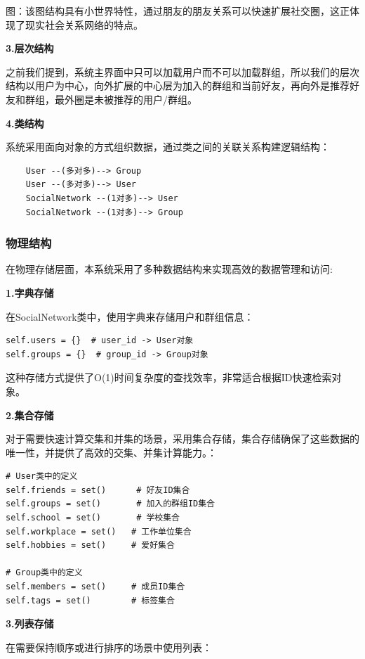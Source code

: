 \documentclass[12pt,a4paper]{article}
\begin{document}
图：该图结构具有小世界特性，通过朋友的朋友关系可以快速扩展社交圈，这正体现了现实社会关系网络的特点。

\noindent\textbf{3.层次结构}

之前我们提到，系统主界面中只可以加载用户而不可以加载群组，所以我们的层次结构以用户为中心，向外扩展的中心层为加入的群组和当前好友，再向外是推荐好友和群组，最外圈是未被推荐的用户/群组。

\noindent\textbf{4.类结构}

系统采用面向对象的方式组织数据，通过类之间的关联关系构建逻辑结构：

\begin{verbatim}
    User --(多对多)--> Group
    User --(多对多)--> User
    SocialNetwork --(1对多)--> User
    SocialNetwork --(1对多)--> Group
\end{verbatim}

\subsubsection{物理结构}

在物理存储层面，本系统采用了多种数据结构来实现高效的数据管理和访问:

\noindent\textbf{1.字典存储}

在SocialNetwork类中，使用字典来存储用户和群组信息：

\begin{verbatim}
self.users = {}  # user_id -> User对象
self.groups = {}  # group_id -> Group对象
\end{verbatim}

这种存储方式提供了O(1)时间复杂度的查找效率，非常适合根据ID快速检索对象。

\noindent\textbf{2.集合存储}

对于需要快速计算交集和并集的场景，采用集合存储，集合存储确保了这些数据的唯一性，并提供了高效的交集、并集计算能力。：

\begin{verbatim}
# User类中的定义
self.friends = set()      # 好友ID集合
self.groups = set()       # 加入的群组ID集合  
self.school = set()       # 学校集合
self.workplace = set()   # 工作单位集合
self.hobbies = set()     # 爱好集合

# Group类中的定义
self.members = set()     # 成员ID集合
self.tags = set()        # 标签集合
\end{verbatim}

\noindent\textbf{3.列表存储}

在需要保持顺序或进行排序的场景中使用列表：
\end{document}
